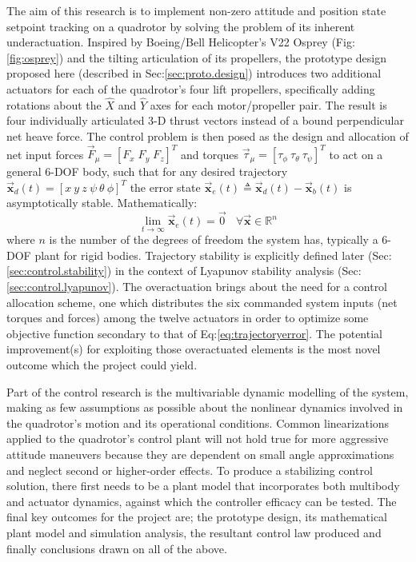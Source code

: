 The aim of this research is to implement non-zero attitude and position state setpoint tracking on a quadrotor by solving the problem of its inherent underactuation. Inspired by Boeing/Bell Helicopter's V22 Osprey (Fig:\ref{fig:osprey}) and the tilting articulation of its propellers, the prototype design proposed here (described in Sec:\ref{sec:proto.design}) introduces two additional actuators for each of the quadrotor's four lift propellers, specifically adding rotations about the $\hat{X}$ and $\hat{Y}$ axes for each motor/propeller pair. The result is four individually articulated 3-D thrust vectors instead of a bound perpendicular net heave force. The control problem is then posed as the design and allocation of net input forces $\vec{F}_{\mu} = [F_x\;F_y\;F_z]^T$ and torques $\vec{\tau}_{\mu} = [\tau_{\phi}~\tau_{\theta}~\tau_{\psi}]^T$ to act on a general 6-DOF body, such that for any desired trajectory $\vec{\mathbf{x}}_d(t)=[x~y~z~\psi~\theta~\phi]^T$ the error state $\vec{\mathbf{x}}_e(t) \triangleq \vec{\mathbf{x}}_d(t) - \vec{\mathbf{x}}_b(t)$ is asymptotically stable. Mathematically:
\begin{equation} \label{eq:trajectoryerror}
\lim_{t \rightarrow \infty} \vec{\mathbf{x}}_e(t) = \vec{0}~~~~\forall \vec{\mathbf{x}} \in \mathbb{R}^n
\end{equation}
where $n$ is the number of the degrees of freedom the system has, typically a 6-DOF plant for rigid bodies. Trajectory stability is explicitly defined later (Sec:\ref{sec:control.stability}) in the context of Lyapunov stability analysis (Sec:\ref{sec:control.lyapunov}). The overactuation brings about the need for a control allocation scheme, one which distributes the six commanded system inputs (net torques and forces) among the twelve actuators in order to optimize some objective function secondary to that of Eq:\ref{eq:trajectoryerror}. The potential improvement(s) for exploiting those overactuated elements is the most novel outcome which the project could yield.
\par
Part of the control research is the multivariable dynamic modelling of the system, making as few assumptions as possible about the nonlinear dynamics involved in the quadrotor's motion and its operational conditions. Common linearizations applied to the quadrotor's control plant will not hold true for more aggressive attitude maneuvers because they are dependent on small angle approximations and neglect second or higher-order effects. To produce a stabilizing control solution, there first needs to be a plant model that incorporates both multibody and actuator dynamics, against which the controller efficacy can be tested. The final key outcomes for the project are; the prototype design, its mathematical plant model and simulation analysis, the resultant control law produced and finally conclusions drawn on all of the above.
